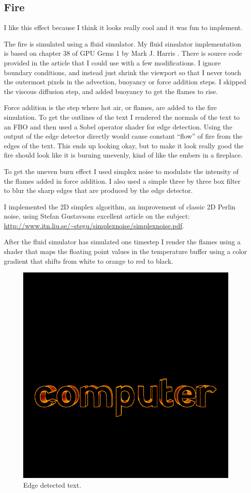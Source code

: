 \documentclass{acmsiggraph}               %
\begin{document}
\subsection{Fire}

I like this effect because I think it looks really cool and it was fun to
implement.

The fire is simulated using a fluid simulator.  My fluid simulator
implementation is based on chapter 38 of GPU Gems 1 by Mark J. Harris
\cite{fernando2004gpu}.  There is source code provided in the article that I
could use with a few modifications. I ignore boundary conditions, and instead
just shrink the viewport so that I never touch the outermost pixels in the
advection, buoyancy or force addition steps. I skipped the viscous diffusion
step, and added buoyancy to get the flames to rise.

Force addition is the step where hot air, or flames, are added to the fire
simulation. To get the outlines of the text I rendered the normals of the text
to an FBO and then used a Sobel operator shader for edge detection. Using the
output of the edge detector directly would cause constant ``flow'' of fire from
the edges of the text. This ends up looking okay, but to make it look really
good the fire should look like it is burning unevenly, kind of like the embers
in a fireplace.

To get the uneven burn effect I used simplex noise to modulate the intensity
of the flames added in force addition. I also used a simple three by three
box filter to blur the sharp edges that are produced by the edge detector.

I implemented the 2D simplex algorithm, an improvement of classic 2D Perlin
noise, using Stefan Gustavsons excellent article on the subject:
\url{http://www.itn.liu.se/~stegu/simplexnoise/simplexnoise.pdf}.

After the fluid simulator has simulated one timestep I render the flames using
a shader that maps the floating point values in the temperature buffer using
a color gradient that shifts from white to orange to red to black.

\begin{figure}[H]
    \centering
    \includegraphics[width=0.7\columnwidth]{fire0.png}
    \caption{Edge detected text.}
\end{figure}
\end{document}
